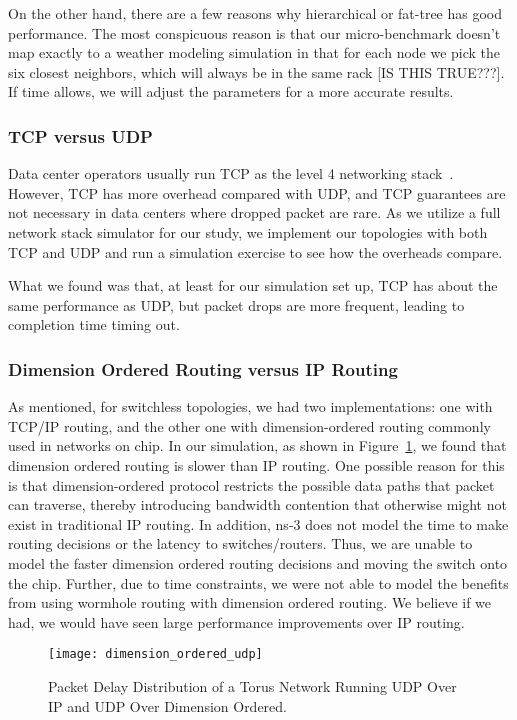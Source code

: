 On the other hand, there are a few reasons why hierarchical or fat-tree has good performance. The most conspicuous reason is that our micro-benchmark doesn't map exactly to a weather modeling simulation in that for each node we pick the six closest neighbors, which will always be in the same rack [IS THIS TRUE???]. If time allows, we will adjust the parameters for a more accurate results.

\subsubsection{TCP versus UDP}
Data center operators usually run TCP as the level 4 networking stack~\cite{Regnier:2004:TCPODCS,Alizadeh:2010:DCT,Kandula:2009:NDC}. However, TCP has more overhead compared with UDP, and TCP guarantees are not necessary in data centers where dropped packet are rare. As we utilize a full network stack simulator for our study, we implement our topologies with both TCP and UDP and run a simulation exercise to see how the overheads compare.

What we found was that, at least for our simulation set up, TCP has about the same performance as UDP, but packet drops are more frequent, leading to completion time timing out.


\subsubsection{Dimension Ordered Routing versus IP Routing}
As mentioned, for switchless topologies, we had two implementations: one with TCP/IP routing, and the other one with dimension-ordered routing commonly used in networks on chip. In our simulation, as shown in Figure~\ref{fig:dim_ordered}, we found that dimension ordered routing is slower than IP routing. One possible reason for this is that dimension-ordered protocol restricts the possible data paths that packet can traverse, thereby introducing bandwidth contention that otherwise might not exist in traditional IP routing.  In addition, ns-3 does not model the time to make routing decisions or the latency to switches/routers.  Thus, we are unable to model the faster dimension ordered routing decisions and moving the switch onto the chip.  Further, due to time constraints, we were not able to model the benefits from using wormhole routing with dimension ordered routing.  We believe if we had, we would have seen large performance improvements over IP routing.

\captionsetup[subfloat]{captionskip=-0.003in}
\begin{figure}
    \centering
    \texttt{[image: dimension\_ordered\_udp]}
    \vspace{-0.1in}
    \caption{Packet Delay Distribution of a Torus Network Running UDP Over IP and UDP Over Dimension Ordered.}
    \label{fig:dim_ordered}
\end{figure}

